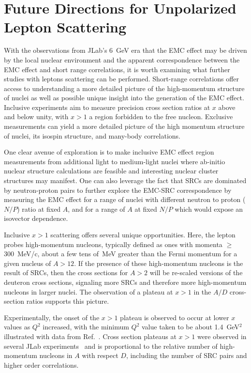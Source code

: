 \section{Future Directions for Unpolarized Lepton Scattering\label{sec:directions}}

With the observations from JLab's 6~GeV era that the EMC effect may be driven by the local nuclear environment
and the apparent correspondence between the EMC effect and short range correlations, it is worth examining what
further studies with leptons scattering can be performed.
Short-range correlations offer access to understanding a more detailed picture of the high-momentum structure of nuclei as well as possible unique insight into the generation of the EMC effect.  Inclusive experiments aim to measure precision cross section ratios at $x$ above and below unity, with $x > 1$ a region forbidden to the free nucleon.  Exclusive measurements can yield a more detailed picture of the high momentum structure of nuclei, its isospin structure, and many-body correlations.


One clear avenue of exploration is to make inclusive EMC effect region measurements from additional light to medium-light
nuclei where ab-initio nuclear structure calculations are feasible and interesting nuclear cluster
structures may manifest.  One can also leverage the fact that SRCs are dominated by neutron-proton pairs to further explore
the EMC-SRC correspondence by measuring the EMC effect for a range of nuclei with
different neutron to proton ($N/P$) ratio at fixed $A$, and for a range of $A$ at fixed $N/P$ which would
expose an isovector dependence.

Inclusive $x>1$ scattering offers several unique opportunities.  Here, the lepton probes high-momentum nucleons, typically defined as ones with momenta $\ge$300~MeV/c, about a few tens of~MeV greater than the Fermi momentum for a given nucleus of $A>12$.  If the presence of these high-momentum nucleons is the result of SRCs, then the cross sections for $A>2$ will be re-scaled versions of the deuteron cross sections, signaling more SRCs and therefore more high-momentum nucleons in larger nuclei.   The observation of a plateau at $x>1$ in the $A/D$ cross-section ratios supports this picture. 

 Experimentally, the onset of the $x>1$ plateau is observed to occur at lower $x$ values as $Q^2$ increased, with the minimum $Q^2$ value taken to be about 1.4~GeV$^2$ illustrated with data from Ref.~\cite{Egiyan:2003vg}.  Cross section plateaus at $x>1$ were observed in several JLab experiments~\cite{Egiyan:2003vg, Fomin:2011ng} and is proportional to the relative number of high-momentum nucleons in $A$ with respect $D$, including the number of SRC pairs and higher order correlations.   %

